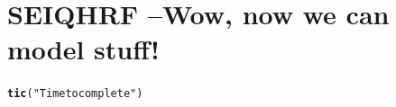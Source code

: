 \documentclass{article}\usepackage[]{graphicx}\usepackage[]{color}
\makeatletter
\newcommand{\hlstr}[1]{\textcolor[rgb]{0.192,0.494,0.8}{#1}}%
\newcommand{\hlstd}[1]{\textcolor[rgb]{0.345,0.345,0.345}{#1}}%
\newcommand{\hlkwd}[1]{\textcolor[rgb]{0.737,0.353,0.396}{\textbf{#1}}}%
\newenvironment{kframe}{%
 \def\at@end@of@kframe{}%
 \ifinner\ifhmode%
  \def\at@end@of@kframe{\end{minipage}}%
  \begin{minipage}{\columnwidth}%
 \fi\fi%
 \def\FrameCommand##1{\hskip\@totalleftmargin \hskip-\fboxsep
 \colorbox{shadecolor}{##1}\hskip-\fboxsep
     \hskip-\linewidth \hskip-\@totalleftmargin \hskip\columnwidth}%
 \MakeFramed {\advance\hsize-\width
   \@totalleftmargin\z@ \linewidth\hsize
   \@setminipage}}%
 {\par\unskip\endMakeFramed%
 \at@end@of@kframe}
\newenvironment{knitrout}{}{} %
\makeatother
\begin{document}
\section{SEIQHRF --Wow, now we can model stuff!}


\begin{knitrout}
\color{fgcolor}\begin{kframe}
\begin{alltt}
\hlkwd{tic}\hlstd{(}\hlstr{"Time to complete"}\hlstd{)}
\end{alltt}
\end{kframe}
\end{knitrout}
\end{document}
